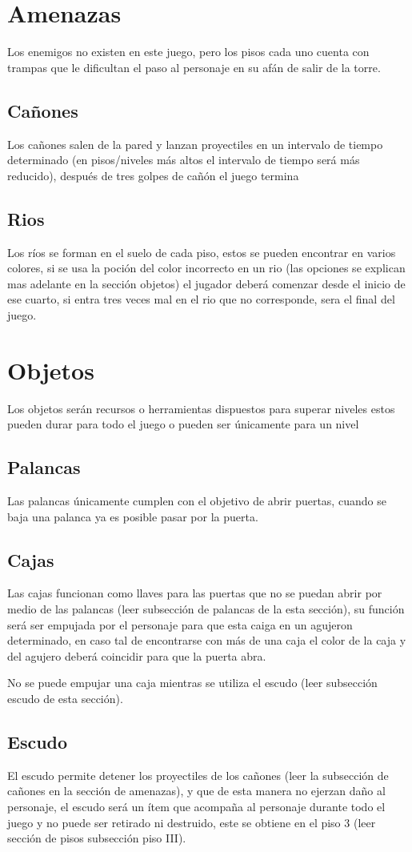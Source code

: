 \documentclass{article}
\begin{document}
\section{Amenazas}\label{intro}
Los enemigos no existen en este juego, pero los pisos cada uno cuenta con trampas que le dificultan el paso al personaje en su afán de salir de la torre.
\subsection{Cañones}
Los cañones salen de la pared y lanzan proyectiles en un intervalo de tiempo determinado (en pisos/niveles más altos el intervalo de tiempo será más reducido), después de tres golpes de cañón el juego termina
\subsection{Rios}
Los ríos se forman en el suelo de cada piso, estos se pueden encontrar en varios colores, si se usa la poción del color incorrecto en un rio (las opciones se explican mas adelante en la sección objetos) el jugador deberá comenzar desde el inicio de ese cuarto, si entra tres veces mal en el rio que no corresponde, sera el final del juego.
\section{Objetos}\label{intro}
Los objetos serán recursos o herramientas  dispuestos para superar niveles estos pueden durar para todo el juego o pueden ser únicamente para un nivel
\subsection{Palancas}
Las palancas únicamente cumplen con el objetivo de abrir puertas, cuando se baja una palanca ya es posible pasar por la puerta.
\subsection{Cajas}
Las cajas funcionan como llaves para las puertas que no se puedan abrir por medio de las palancas (leer subsección de palancas de la esta sección), su función será ser empujada por el personaje para que esta caiga en un agujeron determinado, en caso tal de encontrarse con más de una caja el color de la caja y del agujero deberá coincidir para que la puerta abra.

No se puede empujar una caja mientras se utiliza el escudo (leer subsección escudo de esta sección).
\subsection{Escudo}
El escudo permite detener los proyectiles de los cañones (leer la subsección de cañones en la sección de amenazas), y que de esta manera no ejerzan daño al personaje, el escudo será un ítem que acompaña al personaje durante todo el juego y no puede ser retirado ni destruido, este se obtiene en el piso 3 (leer sección de pisos subsección piso III).
\end{document}
